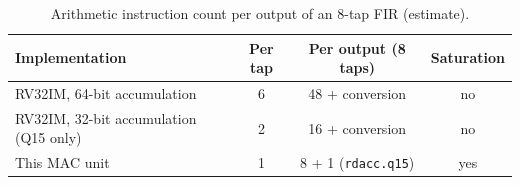 \documentclass[11pt,a4paper]{report}
\newcommand{\code}[1]{\texttt{#1}}
\begin{document}
\begin{table}[H]
  \centering
  \caption{Arithmetic instruction count per output of an 8-tap FIR (estimate).}
  \label{tab:perf}
  \small
  \begin{tabular}{@{}lccc@{}}
    \toprule
    Implementation & Per tap & Per output (8 taps) & Saturation \\
    \midrule
    RV32IM, 64-bit accumulation        & 6 & 48 + conversion & no \\
    RV32IM, 32-bit accumulation (Q15 only) & 2 & 16 + conversion & no \\
    This MAC unit                      & 1 & 8 + 1 (\code{rdacc.q15}) & yes \\
    \bottomrule
  \end{tabular}
\end{table}




\end{document}
